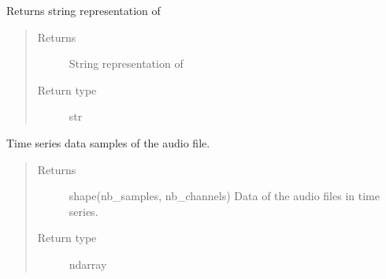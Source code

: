 \documentclass[letterpaper,10pt,english]{sphinxmanual}
\begin{document}
\begin{fulllineitems}
\begin{fulllineitems}
\begin{quote}
\begin{description}
\end{description}\end{quote}

\end{fulllineitems}


\begin{fulllineitems}
\label{\detokenize{docs/source/preprocess:preprocess.track_classes.Audio.__str__}}
Returns string representation of 
\begin{quote}\begin{description}
\item[{Returns}] \leavevmode
String representation of 

\item[{Return type}] \leavevmode
str

\end{description}\end{quote}

\end{fulllineitems}


\begin{fulllineitems}
\label{\detokenize{docs/source/preprocess:preprocess.track_classes.Audio.data}}
Time series data samples of the audio file.
\begin{quote}\begin{description}
\item[{Returns}] \leavevmode
shape(nb\_samples, nb\_channels)
Data of the audio files in time series.

\item[{Return type}] \leavevmode
ndarray

\end{description}\end{quote}

\end{fulllineitems}



\end{fulllineitems}
\end{document}
